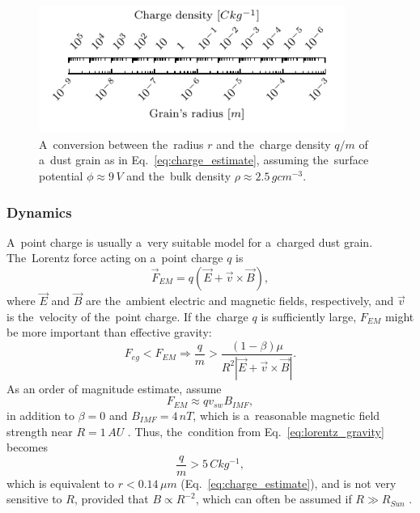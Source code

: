 \begin{figure}[ht]
 	\centering
 	\includegraphics[width=10cm]{figures/charge_density_ruler.pdf}
 	\caption{A~conversion between the~radius $r$ and the~charge density $q/m$ of a~dust grain as in Eq.~\ref{eq:charge_estimate}, assuming the~surface potential $\phi \approx 9 \, \si{V}$ and the~bulk density $\rho \approx 2.5 \, \si{g cm^{-3}}$.}
 	\label{fig:charge_density_ruler}
\end{figure}

\subsubsection{Dynamics}

A~point charge is usually a~very suitable model for a~charged dust grain. The~Lorentz force acting on a~point charge $q$ is
\begin{equation}
\vec{F}_{EM} = q \left( \vec{E} + \vec{v} \times \vec{B} \right),
\end{equation}
where $\vec{E}$ and $\vec{B}$ are the~ambient electric and magnetic fields, respectively, and $\vec{v}$ is the~velocity of the~point charge. If the~charge $q$ is sufficiently large, $F_{EM}$ might be more important than effective gravity:
\begin{equation}
    F_{eg} < F_{EM} \Rightarrow \frac{q}{m} > \frac{(1-\beta)\mu}{R^2 \left| \vec{E} + \vec{v} \times \vec{B} \right|}. \label{eq:lorentz_gravity}
\end{equation}
As an order of magnitude estimate, assume 
\begin{equation}
    F_{EM} \approx q v_{sw} B_{IMF},
    \label{eq:EM_estimate}
\end{equation}
in addition to $\beta = 0$ and $B_{IMF} = 4 \, \si{nT}$, which is a~reasonable magnetic field strength near $R = 1 \, \si{AU}$ \citep{mann2007nanoparticles}. Thus, the~condition from Eq.~\ref{eq:lorentz_gravity} becomes
\begin{equation}
    \frac{q}{m} > 5 \, \si{C kg^{-1}},
\end{equation}
which is equivalent to $r < 0.14 \, \si{\mu m}$ (Eq.~\ref{eq:charge_estimate}), and is not very sensitive to $R$, provided that $B \propto R^{-2}$, which can often be assumed if $R \gg R_{Sun}$ \citep{parker1958dynamics}.  

